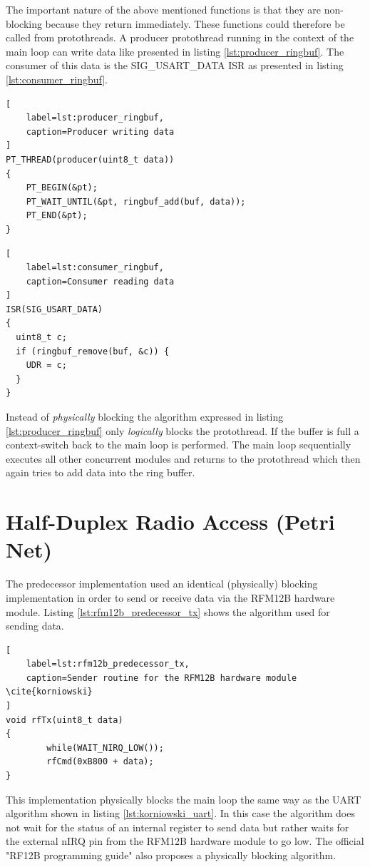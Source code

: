 The important nature of the above mentioned functions is that they are non-blocking because they return immediately. These functions could therefore be called from protothreads. A producer protothread running in the context of the main loop can write data like presented in listing \ref{lst:producer_ringbuf}. The consumer of this data is the SIG\_USART\_DATA ISR as presented in listing \ref{lst:consumer_ringbuf}.

\begin{lstlisting}[
    label=lst:producer_ringbuf,
    caption=Producer writing data
]
PT_THREAD(producer(uint8_t data))
{
    PT_BEGIN(&pt);
    PT_WAIT_UNTIL(&pt, ringbuf_add(buf, data));
    PT_END(&pt);
}
\end{lstlisting}

\begin{lstlisting}[
    label=lst:consumer_ringbuf,
    caption=Consumer reading data
]
ISR(SIG_USART_DATA)
{
  uint8_t c;
  if (ringbuf_remove(buf, &c)) {
    UDR = c;
  }
}
\end{lstlisting}

Instead of \emph{physically} blocking the algorithm expressed in listing \ref{lst:producer_ringbuf} only \emph{logically} blocks the protothread. If the buffer is full a context-switch back to the main loop is performed. The main loop sequentially executes all other concurrent modules and returns to the protothread which then again tries to add data into the ring buffer.

\section{Half-Duplex Radio Access (Petri Net)}
\label{sec:petri}
The predecessor implementation used an identical (physically) blocking implementation in order to send or receive data via the RFM12B hardware module. Listing \ref{lst:rfm12b_predecessor_tx} shows the algorithm used for sending data.

\begin{lstlisting}[
    label=lst:rfm12b_predecessor_tx,
    caption=Sender routine for the RFM12B hardware module \cite{korniowski}
]
void rfTx(uint8_t data)
{
        while(WAIT_NIRQ_LOW());
        rfCmd(0xB800 + data);
}
\end{lstlisting}

This implementation physically blocks the main loop the same way as the UART algorithm shown in listing \ref{lst:korniowski_uart}. In this case the algorithm does not wait for the status of an internal register to send data but rather waits for the external nIRQ pin from the RFM12B hardware module to go low. The official "RF12B programming guide" \cite{rf12b_programming_guide} also proposes a physically blocking algorithm.

